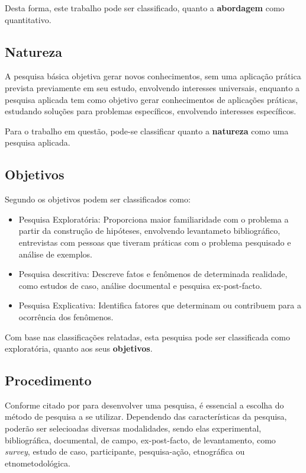 Desta forma, este trabalho pode ser classificado, quanto a \textbf{abordagem} como quantitativo.

\subsection{Natureza}

A pesquisa básica objetiva gerar novos conhecimentos, sem uma aplicação prática prevista previamente em seu estudo, envolvendo interesses universais, enquanto a pesquisa aplicada tem como objetivo gerar conhecimentos de aplicações práticas, estudando soluções para problemas específicos, envolvendo interesses específicos. \cite{metodologia1}

Para o trabalho em questão, pode-se classificar quanto a \textbf{natureza} como uma pesquisa aplicada.

\subsection{Objetivos}

Segundo \cite{metodologia2} os objetivos podem ser classificados como:

\begin{itemize}
    \item Pesquisa Exploratória: Proporciona maior familiaridade com o problema a partir da construção de hipóteses, envolvendo levantameto bibliográfico, entrevistas com pessoas que tiveram práticas com o problema pesquisado e análise de exemplos.
    
    \item Pesquisa descritiva: Descreve fatos e fenômenos de determinada realidade, como estudos de caso, análise documental e pesquisa ex-post-facto.
    
    \item Pesquisa Explicativa: Identifica fatores que determinam ou contribuem para a ocorrência dos fenômenos.
\end{itemize}

Com base nas classificações relatadas, esta pesquisa pode ser classificada como exploratória, quanto aos seus \textbf{objetivos}.

\subsection{Procedimento}

Conforme citado por \cite{metodologia1} para desenvolver uma pesquisa, é essencial a escolha do método de pesquisa a se utilizar. Dependendo das características da pesquisa, poderão ser selecioadas diversas modalidades, sendo elas experimental, bibliográfica, documental, de campo, ex-post-facto, de levantamento, como \textit{survey}, estudo de caso, participante, pesquisa-ação, etnográfica ou etnometodológica.

